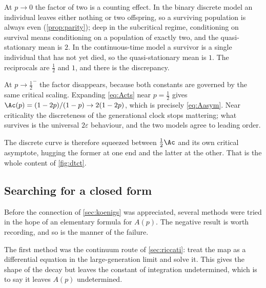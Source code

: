 At $p\to0$ the factor of two is a counting effect. In the binary discrete model an
individual leaves either nothing or two offspring, so a surviving population is
always even (\cref{prop:parity}); deep in the subcritical regime, conditioning on
survival means conditioning on a population of exactly two, and the
quasi-stationary mean is $2$. In the continuous-time model a survivor is a single
individual that has not yet died, so the quasi-stationary mean is $1$. The
reciprocals are $\tfrac12$ and $1$, and there is the discrepancy.

At $p\to\tfrac12^-$ the factor disappears, because both constants are governed by
the same critical scaling. Expanding \cref{eq:Acts} near $p=\tfrac12$ gives
$\Ac(p) = (1-2p)/(1-p)\to2(1-2p)$, which is precisely \cref{eq:Aasym}. Near
criticality the discreteness of the generational clock stops mattering; what
survives is the universal $2\varepsilon$ behaviour, and the two models agree to
leading order.

The discrete curve is therefore squeezed between $\tfrac12\Ac$ and its own critical
asymptote, hugging the former at one end and the latter at the other. That is the
whole content of \cref{fig:dtct}.

\subsection{Searching for a closed form}
\label{sec:GA}

Before the connection of \cref{sec:koenigs} was appreciated, several methods were
tried in the hope of an elementary formula for $A(p)$. The negative result is worth
recording, and so is the manner of the failure.

The first method was the continuum route of \cref{sec:riccati}: treat the map as a
differential equation in the large-generation limit and solve it. This gives the
shape of the decay but leaves the constant of integration undetermined, which is to
say it leaves $A(p)$ undetermined.


